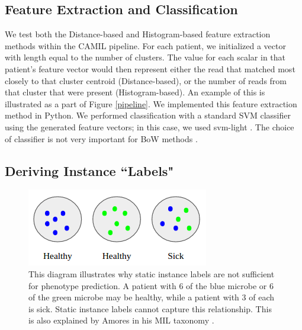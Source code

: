 \subsection{Feature Extraction and Classification}

We test both the Distance-based and Histogram-based feature extraction methods within the CAMIL pipeline. For each patient, we initialized a vector with length equal to the number of clusters. The value for each scalar in that patient's feature vector would then represent either the read that matched most closely to that cluster centroid (Distance-based), or the number of reads from that cluster that were present (Histogram-based). An example of this is illustrated as a part of Figure \ref{pipeline}. We implemented this feature extraction method in Python. We performed classification with a standard SVM classifier using the generated feature vectors; in this case, we used svm-light \cite{joachims08}. The choice of classifier is not very important for BoW methods \cite{amores13}.

\subsection{Deriving Instance ``Labels"}
\label{deriving-instances}

\begin{figure}[t]
\centering
\includegraphics[scale=0.5]{./instance-labels.png}
\caption{This diagram illustrates why static instance labels are not sufficient for phenotype prediction. A patient with 6 of the blue microbe or 6 of the green microbe may be healthy, while a patient with 3 of each is sick. Static instance labels cannot capture this relationship. This is also explained by Amores in his MIL taxonomy \cite{amores13}.} \label{instance-labels}
\end{figure}

